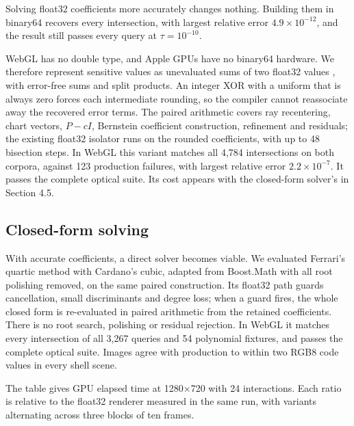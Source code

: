 \documentclass{jcgt}
\begin{document}
Solving float32 coefficients more accurately changes nothing. Building
them in binary64 recovers every intersection, with largest relative
error \(4.9\times10^{-12}\), and the result still passes every query at
\(\tau=10^{-10}\).

WebGL has no double type, and Apple GPUs have no binary64 hardware. We
therefore represent sensitive values as unevaluated sums of two float32
values \citep{dekker1971}, with error-free sums and split products. An
integer XOR with a uniform that is always zero forces each intermediate
rounding, so the compiler cannot reassociate away the recovered error
terms. The paired arithmetic covers ray recentering, chart vectors,
\(P-cI\), Bernstein coefficient construction, refinement and residuals;
the existing float32 isolator runs on the rounded coefficients, with up
to 48 bisection steps. In WebGL this variant matches all 4,784
intersections on both corpora, against 123 production failures, with
largest relative error \(2.2\times10^{-7}\). It passes the complete
optical suite. Its cost appears with the closed-form solver's in Section
4.5.

\subsection{Closed-form solving}\label{closed-form-solving}

With accurate coefficients, a direct solver becomes viable. We evaluated
Ferrari's quartic method with Cardano's cubic, adapted from Boost.Math
\citep{thompson2021} with all root polishing removed, on the same paired
construction. Its float32 path guards cancellation, small discriminants
and degree loss; when a guard fires, the whole closed form is
re-evaluated in paired arithmetic from the retained coefficients. There
is no root search, polishing or residual rejection. In WebGL it matches
every intersection of all 3,267 queries and 54 polynomial fixtures, and
passes the complete optical suite. Images agree with production to
within two RGB8 code values in every shell scene.

The table gives GPU elapsed time at 1280×720 with 24 interactions. Each
ratio is relative to the float32 renderer measured in the same run, with
variants alternating across three blocks of ten frames.
\end{document}
